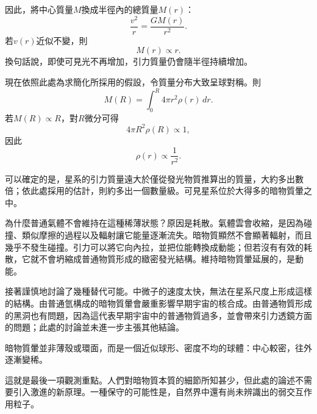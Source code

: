 因此，將中心質量\(M\)換成半徑內的總質量\(M(r)\)：
\begin{equation}
\frac{v^2}{r}=\frac{G M(r)}{r^2}.
\end{equation}
若\(v(r)\)近似不變，則
\begin{equation}
M(r)\propto r.
\end{equation}
換句話說，即使可見光不再增加，引力質量仍會隨半徑持續增加。

現在依照此處為求簡化所採用的假設，令質量分布大致呈球對稱。則
\begin{equation}
M(R)=\int_0^R 4\pi r^2\rho(r)\,dr.
\end{equation}
若\(M(R)\propto R\)，對\(R\)微分可得
\begin{equation}
4\pi R^2\rho(R)\propto 1,
\end{equation}
因此
\begin{equation}
\rho(r)\propto \frac{1}{r^2}.
\end{equation}

\begin{classroomqa}
\end{classroomqa}

可以確定的是，星系的引力質量遠大於僅從發光物質推算出的質量，大約多出數倍；依此處採用的估計，則約多出一個數量級。可見星系位於大得多的暗物質暈之中。

為什麼普通氣體不會維持在這種稀薄狀態？原因是耗散。氣體雲會收縮，是因為碰撞、類似摩擦的過程以及輻射讓它能量逐漸流失。暗物質顯然不會顯著輻射，而且幾乎不發生碰撞。引力可以將它向內拉，並把位能轉換成動能；但若沒有有效的耗散，它就不會坍縮成普通物質形成的緻密發光結構。維持暗物質暈延展的，是動能。

接著謹慎地討論了幾種替代可能。中微子的速度太快，無法在星系尺度上形成這樣的結構。由普通氫構成的暗物質暈會嚴重影響早期宇宙的核合成。由普通物質形成的黑洞也有問題，因為這代表早期宇宙中的普通物質過多，並會帶來引力透鏡方面的問題；此處的討論並未進一步主張其他結論。

暗物質暈並非薄殼或環面，而是一個近似球形、密度不均的球體：中心較密，往外逐漸變稀。

\begin{classroomqa}
\end{classroomqa}

這就是最後一項觀測重點。人們對暗物質本質的細節所知甚少，但此處的論述不需要引入激進的新原理。一種保守的可能性是，自然界中還有尚未辨識出的弱交互作用粒子。